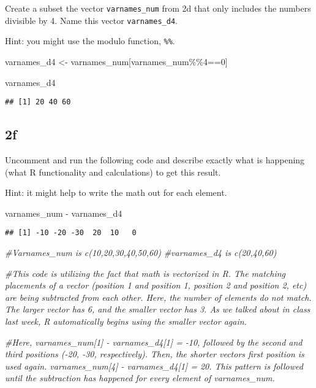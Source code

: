 \documentclass[
]{article}
\newenvironment{Shaded}{\begin{snugshade}}{\end{snugshade}}
\newcommand{\CommentTok}[1]{\textcolor[rgb]{0.56,0.35,0.01}{\textit{#1}}}
\newcommand{\DecValTok}[1]{\textcolor[rgb]{0.00,0.00,0.81}{#1}}
\newcommand{\NormalTok}[1]{#1}
\newcommand{\OtherTok}[1]{\textcolor[rgb]{0.56,0.35,0.01}{#1}}
\newcommand{\SpecialCharTok}[1]{\textcolor[rgb]{0.00,0.00,0.00}{#1}}
\begin{document}
Create a subset the vector \texttt{varnames\_num} from 2d that only
includes the numbers divisible by 4. Name this vector
\texttt{varnames\_d4}.

Hint: you might use the modulo function, \texttt{\%\%}.

\begin{Shaded}
\begin{Highlighting}[]
\NormalTok{varnames\_d4 }\OtherTok{\textless{}{-}}\NormalTok{ varnames\_num[varnames\_num}\SpecialCharTok{\%\%}\DecValTok{4}\SpecialCharTok{==}\DecValTok{0}\NormalTok{]}

\NormalTok{varnames\_d4}
\end{Highlighting}
\end{Shaded}

\begin{verbatim}
## [1] 20 40 60
\end{verbatim}

\hypertarget{f}{%
\subsection{2f}\label{f}}

Uncomment and run the following code and describe exactly what is
happening (what R functionality and calculations) to get this result.

Hint: it might help to write the math out for each element.

\begin{Shaded}
\begin{Highlighting}[]
\NormalTok{varnames\_num }\SpecialCharTok{{-}}\NormalTok{ varnames\_d4}
\end{Highlighting}
\end{Shaded}

\begin{verbatim}
## [1] -10 -20 -30  20  10   0
\end{verbatim}

\begin{Shaded}
\begin{Highlighting}[]
\CommentTok{\#Varnames\_num is c(10,20,30,40,50,60)}
\CommentTok{\#varnames\_d4 is c(20,40,60)}

\CommentTok{\#This code is utilizing the fact that math is vectorized in R. The matching placements of a vector (position 1 and position 1, position 2 and position 2, etc) are being subtracted from each other. Here, the number of elements do not match. The larger vector has 6, and the smaller vector has 3. As we talked about in class last week, R automatically begins using the smaller vector again. }

\CommentTok{\#Here, varnames\_num[1] {-} varnames\_d4[1] = {-}10, followed by the second and third positions ({-}20, {-}30, respectively). Then, the shorter vector\textquotesingle{}s first position is used again. varnames\_num[4] {-} varnames\_d4[1] = 20. This pattern is followed until the subtraction has happened for every element of varnames\_num. }
\end{Highlighting}
\end{Shaded}
\end{document}

